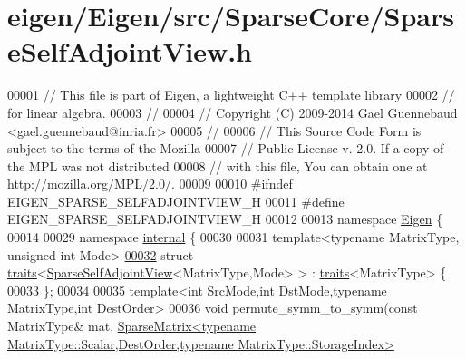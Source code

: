\hypertarget{eigen_2_eigen_2src_2_sparse_core_2_sparse_self_adjoint_view_8h_source}{}\section{eigen/\+Eigen/src/\+Sparse\+Core/\+Sparse\+Self\+Adjoint\+View.h}
\label{eigen_2_eigen_2src_2_sparse_core_2_sparse_self_adjoint_view_8h_source}

\begin{DoxyCode}
00001 \textcolor{comment}{// This file is part of Eigen, a lightweight C++ template library}
00002 \textcolor{comment}{// for linear algebra.}
00003 \textcolor{comment}{//}
00004 \textcolor{comment}{// Copyright (C) 2009-2014 Gael Guennebaud <gael.guennebaud@inria.fr>}
00005 \textcolor{comment}{//}
00006 \textcolor{comment}{// This Source Code Form is subject to the terms of the Mozilla}
00007 \textcolor{comment}{// Public License v. 2.0. If a copy of the MPL was not distributed}
00008 \textcolor{comment}{// with this file, You can obtain one at http://mozilla.org/MPL/2.0/.}
00009 
00010 \textcolor{preprocessor}{#ifndef EIGEN\_SPARSE\_SELFADJOINTVIEW\_H}
00011 \textcolor{preprocessor}{#define EIGEN\_SPARSE\_SELFADJOINTVIEW\_H}
00012 
00013 \textcolor{keyword}{namespace }\hyperlink{namespace_eigen}{Eigen} \{ 
00014   
00029 \textcolor{keyword}{namespace }\hyperlink{namespaceinternal}{internal} \{
00030   
00031 \textcolor{keyword}{template}<\textcolor{keyword}{typename} MatrixType, \textcolor{keywordtype}{unsigned} \textcolor{keywordtype}{int} Mode>
\hyperlink{struct_eigen_1_1internal_1_1traits_3_01_sparse_self_adjoint_view_3_01_matrix_type_00_01_mode_01_4_01_4}{00032} \textcolor{keyword}{struct }\hyperlink{struct_eigen_1_1internal_1_1traits}{traits}<\hyperlink{group___sparse_core___module_class_eigen_1_1_sparse_self_adjoint_view}{SparseSelfAdjointView}<MatrixType,Mode> > : 
      \hyperlink{struct_eigen_1_1internal_1_1traits}{traits}<MatrixType> \{
00033 \};
00034 
00035 \textcolor{keyword}{template}<\textcolor{keywordtype}{int} SrcMode,\textcolor{keywordtype}{int} DstMode,\textcolor{keyword}{typename} MatrixType,\textcolor{keywordtype}{int} DestOrder>
00036 \textcolor{keywordtype}{void} permute\_symm\_to\_symm(\textcolor{keyword}{const} MatrixType& mat, 
      \hyperlink{group___sparse_core___module_class_eigen_1_1_sparse_matrix}{SparseMatrix<typename MatrixType::Scalar,DestOrder,typename MatrixType::StorageIndex>}

\end{DoxyCode}
